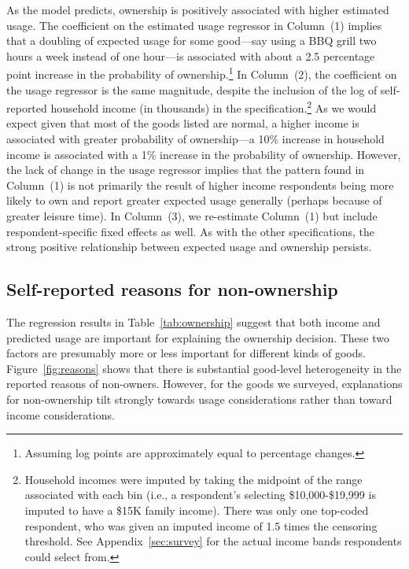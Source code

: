 \documentclass[12pt]{article}
\begin{document}

As the model predicts, ownership is positively associated with higher estimated usage.
The coefficient on the estimated usage regressor in Column~(1) implies that a doubling of expected usage for some good---say using a BBQ grill two hours a week instead of one hour---is associated with about a 2.5 percentage point increase in the probability of ownership.\footnote{Assuming log points are approximately equal to percentage changes.} 
In Column~(2), the coefficient on the usage regressor is the same magnitude, despite the inclusion of the log of self-reported household income (in thousands) in the specification.\footnote{
  Household incomes were imputed by taking the midpoint of the range associated with each bin (i.e., a respondent's selecting \$10,000-\$19,999 is imputed to have a \$15K family income).
  There was only one top-coded respondent, who was given an imputed income of 1.5 times the censoring threshold.
  See Appendix~\ref{sec:survey} for the actual income bands respondents could select from.
  }
As we would expect given that most of the goods listed are normal, a higher income is associated with greater probability of ownership---a 10\% increase in household income is associated with a 1\% increase in the probability of ownership.  
However, the lack of change in the usage regressor implies that the pattern found in Column~(1) is not primarily the result of higher income respondents being more likely to own and report greater expected usage generally (perhaps because of greater leisure time). 
In Column~(3), we re-estimate Column~(1) but include respondent-specific fixed effects as well.
As with the other specifications, the strong positive relationship between expected usage and ownership persists. 

\subsection{Self-reported reasons for non-ownership}
The regression results in Table~\ref{tab:ownership} suggest that both income and predicted usage are important for explaining the ownership decision. 
These two factors are presumably more or less important for different kinds of goods.
Figure~\ref{fig:reasons} shows that there is substantial good-level heterogeneity in the reported reasons of non-owners.
However, for the goods we surveyed, explanations for non-ownership tilt strongly towards usage considerations rather than toward income considerations.
\end{document}
